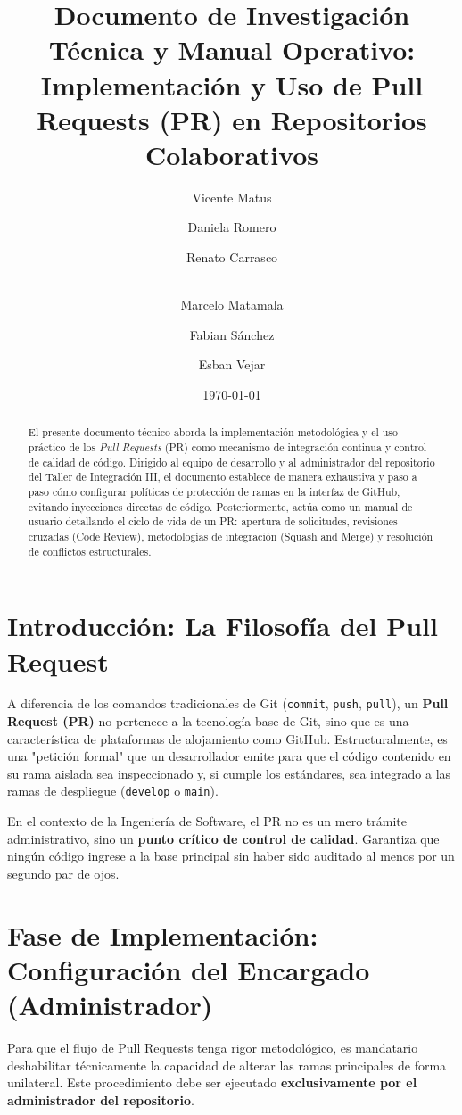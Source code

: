 \documentclass[12pt, a4paper]{article}
\title{Documento de Investigación Técnica y Manual Operativo:\\
\large Implementación y Uso de Pull Requests (PR) en Repositorios Colaborativos}
\author{Vicente Matus \and Daniela Romero \and Renato Carrasco \and \\ Marcelo Matamala \and Fabian Sánchez \and Esban Vejar}
\date{\today}
\begin{document}
\maketitle

\begin{abstract}
El presente documento técnico aborda la implementación metodológica y el uso práctico de los \textit{Pull Requests} (PR) como mecanismo de integración continua y control de calidad de código. Dirigido al equipo de desarrollo y al administrador del repositorio del Taller de Integración III, el documento establece de manera exhaustiva y paso a paso cómo configurar políticas de protección de ramas en la interfaz de GitHub, evitando inyecciones directas de código. Posteriormente, actúa como un manual de usuario detallando el ciclo de vida de un PR: apertura de solicitudes, revisiones cruzadas (Code Review), metodologías de integración (Squash and Merge) y resolución de conflictos estructurales.
\end{abstract}

\tableofcontents
\newpage

\section{Introducción: La Filosofía del Pull Request}
A diferencia de los comandos tradicionales de Git (\texttt{commit}, \texttt{push}, \texttt{pull}), un \textbf{Pull Request (PR)} no pertenece a la tecnología base de Git, sino que es una característica de plataformas de alojamiento como GitHub. Estructuralmente, es una "petición formal" que un desarrollador emite para que el código contenido en su rama aislada sea inspeccionado y, si cumple los estándares, sea integrado a las ramas de despliegue (\texttt{develop} o \texttt{main}).

En el contexto de la Ingeniería de Software, el PR no es un mero trámite administrativo, sino un \textbf{punto crítico de control de calidad}. Garantiza que ningún código ingrese a la base principal sin haber sido auditado al menos por un segundo par de ojos.

\section{Fase de Implementación: Configuración del Encargado (Administrador)}
Para que el flujo de Pull Requests tenga rigor metodológico, es mandatario deshabilitar técnicamente la capacidad de alterar las ramas principales de forma unilateral. Este procedimiento debe ser ejecutado \textbf{exclusivamente por el administrador del repositorio}.
\end{document}
